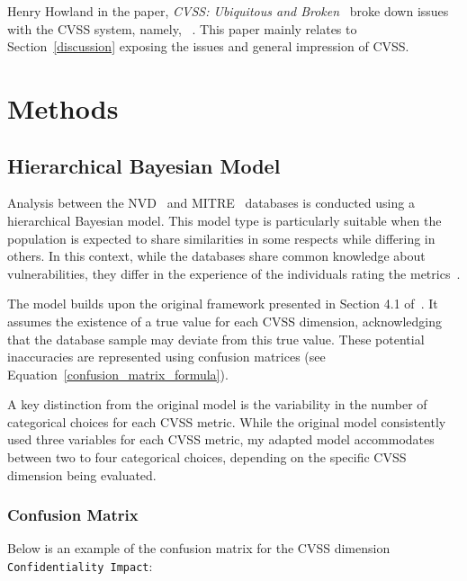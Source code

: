 \documentclass[12pt]{article}
\begin{document}
Henry Howland in the paper, \textit{CVSS: Ubiquitous and Broken}~\cite{ubiquitous} broke down issues with
the CVSS system, namely, ~\cite{ubiquitous}.  This paper mainly relates to Section~\ref{discussion} exposing the
issues and general impression of CVSS.

\section{Methods}

\subsection{Hierarchical Bayesian Model} \label{bayesian_modeling}

Analysis between the NVD~\cite{NVD} and MITRE~\cite{MITRE} databases is conducted using a
hierarchical Bayesian model. This model type is particularly suitable when the population is
expected to share similarities in some respects while differing in others. In this context, while
the databases share common knowledge about vulnerabilities, they differ in the experience of the
individuals rating the metrics~\cite{bayes}.

The model builds upon the original framework presented in Section 4.1 of~\cite{bayes}. It assumes
the existence of a true value for each CVSS dimension, acknowledging that the database sample may
deviate from this true value. These potential inaccuracies are represented using confusion matrices
(see Equation~\ref{confusion_matrix_formula}).

A key distinction from the original model is the variability in the number of categorical choices
for each CVSS metric. While the original model consistently used three variables for each CVSS
metric, my adapted model accommodates between two to four categorical choices, depending on the
specific CVSS dimension being evaluated.

\subsubsection{Confusion Matrix}

Below is an example of the confusion matrix for the CVSS dimension \texttt{Confidentiality Impact}:
\end{document}
